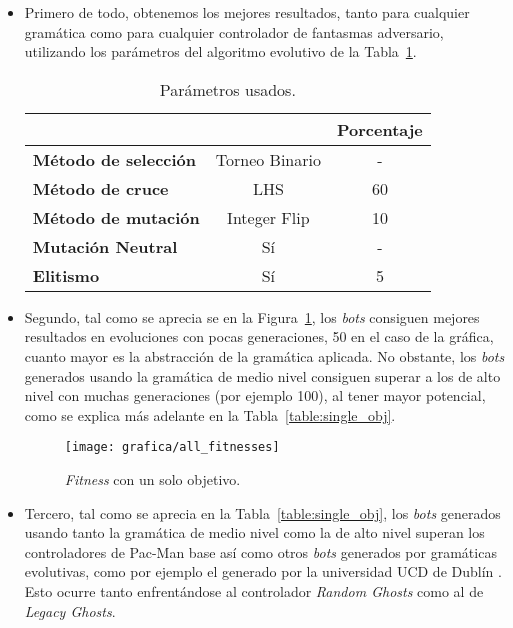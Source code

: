 \begin{itemize}
\item Primero de todo, obtenemos los mejores resultados, tanto para cualquier gramática como para cualquier controlador de fantasmas adversario, utilizando los parámetros del algoritmo evolutivo de la Tabla~\ref{table:best-params-es}.

\begin{table}[h]
\centering
\begin{tabular}{lc|c|}
\cline{3-3}
                                                   &                              & \textbf{Porcentaje} \\ \hline
\multicolumn{1}{|l|}{\textbf{Método de selección}} & Torneo Binario \footnotemark & -                   \\ \hline
\multicolumn{1}{|l|}{\textbf{Método de cruce}}     & LHS                                                           & 60                  \\ \hline
\multicolumn{1}{|l|}{\textbf{Método de mutación}}  & Integer Flip                                                  & 10                  \\ \hline
\multicolumn{1}{|l|}{\textbf{Mutación Neutral}}    & Sí                                                            & -                   \\ \hline
\multicolumn{1}{|l|}{\textbf{Elitismo}}            & Sí                                                            & 5                   \\ \hline
\end{tabular}
\caption{Parámetros usados.}
\label{table:best-params-es}
\end{table}

\item Segundo, tal como se aprecia se en la Figura~\ref{graph:all_fitness}, los \textit{bots} consiguen mejores resultados en evoluciones con pocas generaciones, 50 en el caso de la gráfica, cuanto mayor es la abstracción de la gramática aplicada. No obstante, los \textit{bots} generados usando la gramática de medio nivel consiguen superar a los de alto nivel con muchas generaciones (por ejemplo 100), al tener mayor potencial, como se explica más adelante en la Tabla~\ref{table:single_obj}.

\begin{figure}[h]
\centering
\texttt{[image: grafica/all\_fitnesses]}
\caption{\textit{Fitness} con un solo objetivo.}
\label{graph:all_fitness}
\end{figure}

\item Tercero, tal como se aprecia en la Tabla~\ref{table:single_obj}, los \textit{bots} generados usando tanto la gramática de medio nivel como la de alto nivel superan los controladores de Pac-Man base así como otros \textit{bots} generados por gramáticas evolutivas, como por ejemplo el generado por la universidad UCD de Dublín \cite{galvan2010evolving}. Esto ocurre tanto enfrentándose al controlador \textit{Random Ghosts} como al de \textit{Legacy Ghosts}.
\end{itemize}


